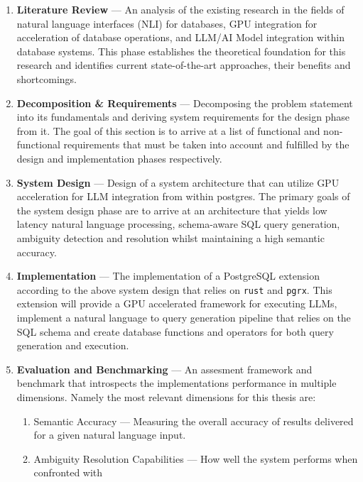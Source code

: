 \documentclass{article}
\begin{document}
\begin{enumerate}
    \item \textbf{Literature Review} — An analysis of the existing research in the fields of
          natural language interfaces (NLI) for databases, GPU integration for acceleration
          of database operations, and LLM/AI Model integration within database systems.
          This phase establishes the theoretical foundation for this research and identifies current 
          state-of-the-art approaches, their benefits and shortcomings.
     \item \textbf{Decomposition \& Requirements} — Decomposing the problem statement into its
          fundamentals and deriving system requirements for the design phase from it. The goal
          of this section is to arrive at a list of functional and non-functional requirements that
          must be taken into account and fulfilled by the design and implementation phases respectively.
     \item \textbf{System Design} — Design of a system architecture that can utilize GPU acceleration
          for LLM integration from within postgres. The primary goals of the system design phase
          are to arrive at an architecture that yields low latency natural language processing,
          schema-aware SQL query generation, ambiguity detection and resolution whilst maintaining
          a high semantic accuracy.
     \item \textbf{Implementation} — The implementation of a PostgreSQL extension according to the
          above system design that relies on \texttt{rust} and \texttt{pgrx}. This extension will
          provide a GPU accelerated framework for executing LLMs, implement a natural language
          to query generation pipeline that relies on the SQL schema and create database functions
          and operators for both query generation and execution.
     \item \textbf{Evaluation and Benchmarking} — An assesment framework and benchmark that introspects
          the implementations performance in multiple dimensions. Namely the most relevant dimensions
          for this thesis are:
          \begin{enumerate}
              \item Semantic Accuracy — Measuring the overall accuracy of results delivered for a given
                    natural language input.
              \item Ambiguity Resolution Capabilities — How well the system performs when confronted with

\end{enumerate}
\end{enumerate}
\end{document}
